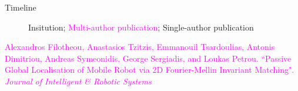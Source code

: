 \begin{frame}{Timeline}

\begin{figure}[t!] \centering
        
        \caption{\textcolor[RGB]{32,74,135}{Insitution}; \textcolor{magenta}{Multi-author publication}; \textcolor[RGB]{78,154,0}{Single-author publication}}
\end{figure}

\placebottom \tiny
\textcolor{magenta}{Alexandros Filotheou, Anastasios Tzitzis, Emmanouil Tsardoulias, Antonis Dimitriou, Andreas
Symeonidis, George Sergiadis, and Loukas Petrou. ``Passive Global Localisation of Mobile Robot via
2D Fourier-Mellin Invariant Matching". \textit{Journal of Intelligent \& Robotic Systems}}

\end{frame}
